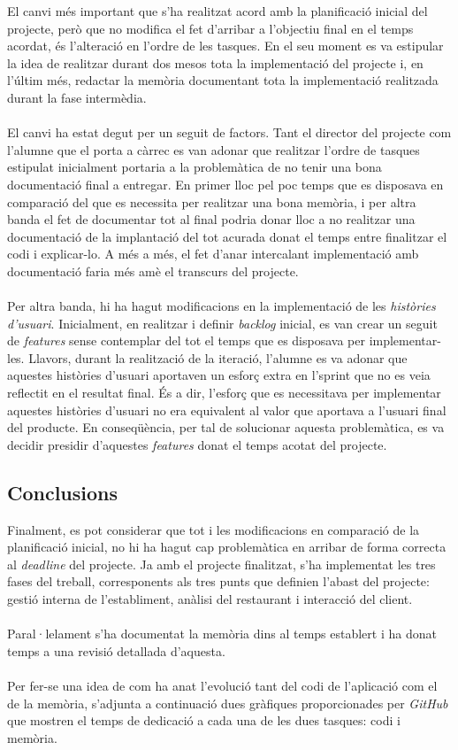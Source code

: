El canvi més important que s'ha realitzat acord amb la planificació inicial del projecte, però que no modifica el fet d'arribar a l'objectiu final en el temps acordat, és l'alteració en l'ordre de les tasques. En el seu moment es va estipular la idea de realitzar durant dos mesos tota la implementació del projecte i, en l'últim més, redactar la memòria documentant tota la implementació realitzada durant la fase intermèdia.
\\\\
El canvi ha estat degut per un seguit de factors. Tant el director del projecte com l'alumne que el porta a càrrec es van adonar que realitzar l'ordre de tasques estipulat inicialment portaria a la problemàtica de no tenir una bona documentació final a entregar. En primer lloc pel poc temps que es disposava en comparació del que es necessita per realitzar una bona memòria, i per altra banda el fet de documentar tot al final podria donar lloc a no realitzar una documentació de la implantació del tot acurada donat el temps entre finalitzar el codi i explicar-lo. A més a més, el fet d'anar intercalant implementació amb documentació faria més amè el transcurs del projecte.
\\\\
Per altra banda, hi ha hagut modificacions en la implementació de les \textit{històries d'usuari}. Inicialment, en realitzar i definir \textit{backlog} inicial, es van crear un seguit de \textit{features} sense contemplar del tot el temps que es disposava per implementar-les. Llavors, durant la realització de la iteració, l'alumne es va adonar que aquestes històries d'usuari aportaven un esforç extra en l'sprint que no es veia reflectit en el resultat final. És a dir, l'esforç que es necessitava per implementar aquestes històries d'usuari no era equivalent al valor que aportava a l'usuari final del producte. En conseqüència, per tal de solucionar aquesta problemàtica, es va decidir presidir d'aquestes \textit{features} donat el temps acotat del projecte.


\subsection{Conclusions}

Finalment, es pot considerar que tot i les modificacions en comparació de la planificació inicial, no hi ha hagut cap problemàtica en arribar de forma correcta al \textit{deadline} del projecte. Ja amb el projecte finalitzat, s'ha implementat les tres fases del treball, corresponents als tres punts que definien l'abast del projecte: gestió interna de l'establiment, anàlisi del restaurant i interacció del client.
\\\\
Paral·lelament s'ha documentat la memòria dins al temps establert i ha donat temps a una revisió detallada d'aquesta.
\\\\
Per fer-se una idea de com ha anat l'evolució tant del codi de l'aplicació com el de la memòria, s'adjunta a continuació dues gràfiques proporcionades per \textit{GitHub} que mostren el temps de dedicació a cada una de les dues tasques: codi i memòria.

